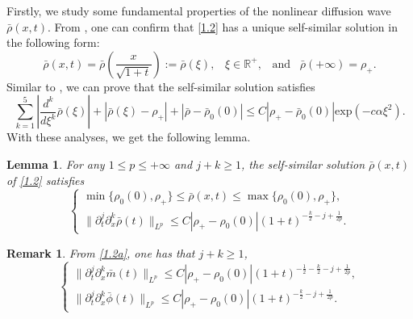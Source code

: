 \documentclass[11pt]{article}
\theoremstyle{plain}
\newtheorem{lemma}{Lemma}[section]
\newtheorem{remark}{Remark}[section]
\numberwithin{equation}{section}
\begin{document}
Firstly, we study some fundamental properties of the nonlinear diffusion wave $\bar{\rho}(x,t)$. 
From \cite{Duyn-Peletier1977}, one can confirm that \eqref{1.2} has a unique self-similar solution in the following form:
	\[
	\bar\rho(x,t)=\bar\rho\left(\frac{x}{\sqrt{1+t}}\right):=\bar\rho(\xi),\;\;\;\xi\in \mathbb{R}^+,\;\;\;\mbox{and}\;\;\;\bar\rho(+\infty)=\rho_{+}.
	\]
	Similar to \cite{Hsiao-Liu1992,Nishihara-Yang1999}, we can prove that the self-similar solution satisfies
	\[
	\sum_{k=1}^{5}\left|\frac{d^k}{d\xi^k}\bar\rho(\xi)\right|+|\bar\rho(\xi)-\rho_+|+|\bar\rho-\bar\rho_{0}(0)|\leq C|\rho_+-\bar\rho_{0}(0)|\mbox{exp}\left(-c\alpha\xi^2\right).
	\]
	With these analyses, we get the following lemma.
	\begin{lemma}\label{l4.1}
		For any $1\leq p\leq +\infty$ and $ j+k\geq 1$,
		the self-similar solution $\bar\rho(x,t)$ of \eqref{1.2} satisfies
		\begin{equation}\label{14.1}
			\left\{
			\begin{array}{lr}
				\min\{\rho_0(0),\rho_+\}\leq \bar\rho(x,t)\leq \max\{\rho_0(0),\rho_+\},\\[2mm]
				\|\partial_t^j\partial_x^k\bar\rho(t)\|_{L^p}\leq C|\rho_+-\rho_0(0)|(1+t)^{-\frac{k}{2}-j+\frac{1}{2p}}.
			\end{array}
			\right.
		\end{equation}
	\end{lemma}
	\begin{remark}
		From  \eqref{1.2a}, one has that $ j+k\geq 1$, 
		\begin{equation}\label{14.2}
			\left\{
			\begin{array}{lr}
				\|\partial_t^j\partial_x^k\bar m(t)\|_{L^p}\leq C|\rho_+-\rho_0(0)|(1+t)^{-\frac{1}{2}-\frac{k}{2}-j+\frac{1}{2p}},\\[2mm]
				\|\partial_t^j\partial_x^k\bar\phi(t)\|_{L^p}\leq C|\rho_+-\rho_0(0)|(1+t)^{-\frac{k}{2}-j+\frac{1}{2p}}.
			\end{array}
			\right.
		\end{equation}
	\end{remark}
	
\end{document}
